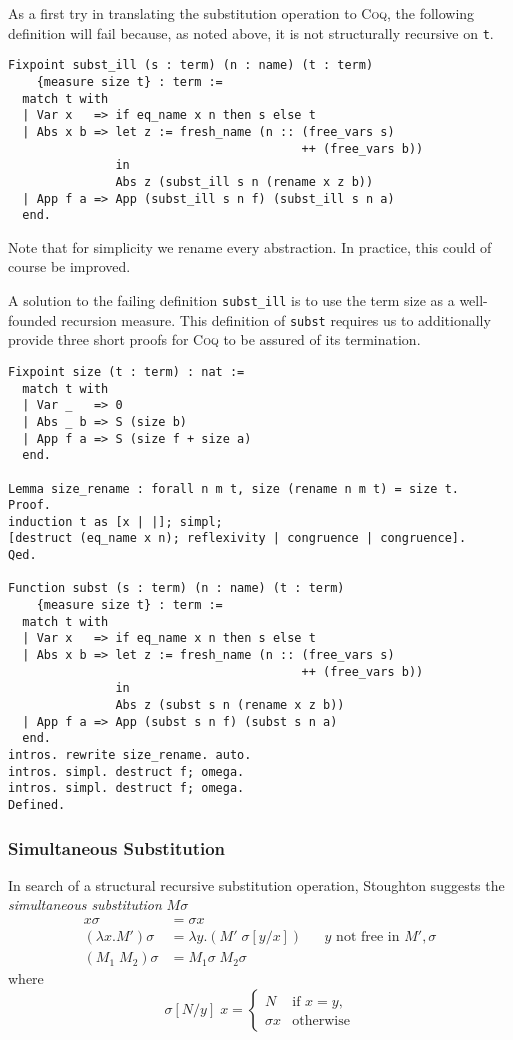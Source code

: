 \documentclass[a4paper,11pt]{article}
\newcommand{\name}[1]{\textsc{#1}\xspace}
\def\Coq{\name{Coq}}
\begin{document}
As a first try in translating the substitution operation to \Coq, the
following definition will fail because, as noted above, it is not
structurally recursive on \lstinline{t}.
\begin{lstlisting}
Fixpoint subst_ill (s : term) (n : name) (t : term)
    {measure size t} : term :=
  match t with
  | Var x   => if eq_name x n then s else t
  | Abs x b => let z := fresh_name (n :: (free_vars s)
                                         ++ (free_vars b))
               in
               Abs z (subst_ill s n (rename x z b))
  | App f a => App (subst_ill s n f) (subst_ill s n a)
  end.
\end{lstlisting}
Note that for simplicity we rename every abstraction. In practice,
this could of course be improved.

A solution to the failing definition \lstinline{subst_ill} is to use
the term size as a well-founded recursion
measure. This definition of \lstinline{subst} requires us to
additionally provide three short proofs for \Coq to be assured of its
termination.
\begin{lstlisting}
Fixpoint size (t : term) : nat :=
  match t with
  | Var _   => 0
  | Abs _ b => S (size b)
  | App f a => S (size f + size a)
  end.

Lemma size_rename : forall n m t, size (rename n m t) = size t.
Proof.
induction t as [x | |]; simpl;
[destruct (eq_name x n); reflexivity | congruence | congruence].
Qed.

Function subst (s : term) (n : name) (t : term)
    {measure size t} : term :=
  match t with
  | Var x   => if eq_name x n then s else t
  | Abs x b => let z := fresh_name (n :: (free_vars s)
                                         ++ (free_vars b))
               in
               Abs z (subst s n (rename x z b))
  | App f a => App (subst s n f) (subst s n a)
  end.
intros. rewrite size_rename. auto.
intros. simpl. destruct f; omega.
intros. simpl. destruct f; omega.
Defined.
\end{lstlisting}

\subsubsection*{Simultaneous Substitution}

In search of a structural recursive substitution operation, Stoughton
\cite{Stoughton-88} suggests the {\em simultaneous substitution} $M \sigma$
\begin{align*}
  x \sigma              &= \sigma x\\
  (\lambda x.M') \sigma &= \lambda y.(M' \; \sigma[y/x])  && \text{$y$ not free in $M', \sigma$}\\
  (M_1 \; M_2) \sigma   &= M_1 \sigma \; M_2 \sigma
\end{align*}
where
\begin{equation*}
  \sigma[N/y] \; x =
  \begin{cases}
    N        & \text{if $x = y$,}\\
    \sigma x & \text{otherwise}
  \end{cases}
\end{equation*}
\end{document}
